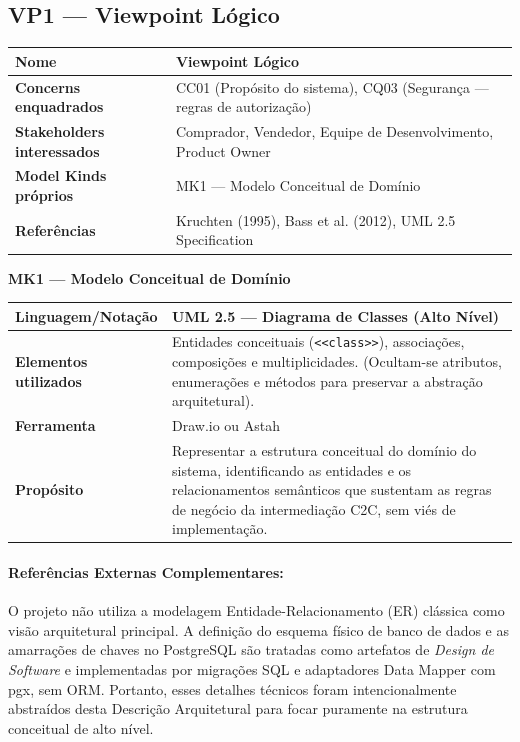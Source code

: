 ﻿\documentclass[12pt,a4paper]{article}
\begin{document}
\subsection{VP1 --- Viewpoint Lógico}

\begin{longtable}{|p{4.5cm}|p{10cm}|}
\hline
\textbf{Nome} & Viewpoint Lógico \\
\hline
\textbf{Concerns enquadrados} & CC01 (Propósito do sistema), CQ03 (Segurança --- regras de autorização) \\
\hline
\textbf{Stakeholders interessados} & Comprador, Vendedor, Equipe de Desenvolvimento, Product Owner \\
\hline
\textbf{Model Kinds próprios} & MK1 --- Modelo Conceitual de Domínio \\
\hline
\textbf{Referências} & Kruchten (1995), Bass et al. (2012), UML 2.5 Specification \\
\hline
\end{longtable}

\noindent\textbf{MK1 --- Modelo Conceitual de Domínio}
\begin{longtable}{|p{4.5cm}|p{10cm}|}
\hline
\textbf{Linguagem/Notação} & UML 2.5 --- Diagrama de Classes (Alto Nível) \\
\hline
\textbf{Elementos utilizados} & Entidades conceituais (\texttt{<<class>>}), associações, composições e multiplicidades. (Ocultam-se atributos, enumerações e métodos para preservar a abstração arquitetural). \\
\hline
\textbf{Ferramenta} & Draw.io ou Astah \\
\hline
\textbf{Propósito} & Representar a estrutura conceitual do domínio do sistema, identificando as entidades e os relacionamentos semânticos que sustentam as regras de negócio da intermediação C2C, sem viés de implementação. \\
\hline
\end{longtable}

\paragraph{Referências Externas Complementares:} O projeto não utiliza a modelagem Entidade-Relacionamento (ER) clássica como visão arquitetural principal. A definição do esquema físico de banco de dados e as amarrações de chaves no PostgreSQL são tratadas como artefatos de \textit{Design de Software} e implementadas por migrações SQL e adaptadores Data Mapper com pgx, sem ORM. Portanto, esses detalhes técnicos foram intencionalmente abstraídos desta Descrição Arquitetural para focar puramente na estrutura conceitual de alto nível.
\end{document}

